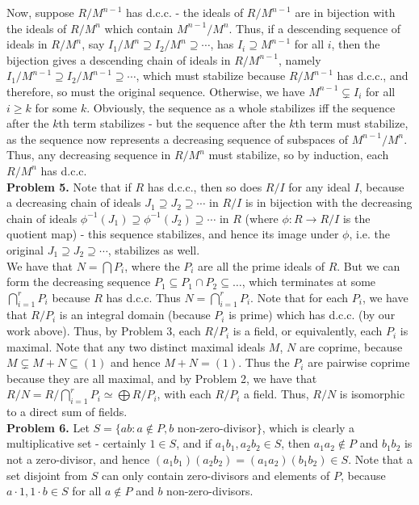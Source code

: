 \documentclass[11pt]{article}
\newcommand{\num}[1]{\noindent \textbf{#1}}
\theoremstyle{definition}
\begin{document}
\noindent Now, suppose $R/M^{n-1}$ has d.c.c. - the ideals of $R/M^{n-1}$ are
in bijection with the ideals of $R/M^n$ which contain $M^{n-1}/M^n$. Thus,
if a descending sequence of ideals in $R/M^n$, say $I_1/M^n\supseteq
I_2/M^n\supseteq \cdots$, has $I_i\supseteq M^{n-1}$ for all $i$, then
the bijection gives a descending chain of ideals in $R/M^{n-1}$, namely
$I_1/M^{n-1}\supseteq I_2/M^{n-1}\supseteq\cdots$, which must stabilize
because $R/M^{n-1}$ has d.c.c., and therefore, so must the original
sequence. Otherwise, we have $M^{n-1}\subsetneq I_i$ for all $i\geq k$ for
some $k$. Obviously, the sequence as a whole stabilizes iff the sequence
after the $k$th term stabilizes - but the sequence after the $k$th term must
stabilize, as the sequence now represents a decreasing sequence of subspaces
of $M^{n-1}/M^n$. Thus, any decreasing sequence in $R/M^n$ must stabilize,
so by induction, each $R/M^n$ has d.c.c.     \\

\num{Problem 5.} Note that if $R$ has d.c.c., then so does $R/I$
for any ideal $I$, because a decreasing chain of ideals $J_1\supseteq
J_2\supseteq\cdots$ in $R/I$ is in bijection with the decreasing chain of
ideals $\phi^{-1}(J_1)\supseteq\phi^{-1}(J_2)\supseteq\cdots$ in $R$ (where
$\phi:R\rightarrow R/I$ is the quotient map) - this sequence stabilizes,
and hence its image under $\phi$, i.e. the original $J_1\supseteq
J_2\supseteq\cdots$, stabilizes as well. \\

\noindent We have that $N=\bigcap P_i$, where the $P_i$ are all the prime
ideals of $R$. But we can form the decreasing sequence $P_1\subseteq P_1\cap
P_2 \subseteq \ldots$, which terminates at some $\bigcap_{i=1}^r P_i$ because
$R$ has d.c.c. Thus $N=\bigcap_{i=1}^r P_i$. Note that for each $P_i$, we
have that $R/P_i$ is an integral domain (because $P_i$ is prime) which has
d.c.c. (by our work above). Thus, by Problem 3, each $R/P_i$ is a field,
or equivalently, each $P_i$ is maximal. Note that any two distinct maximal
ideals $M$, $N$ are coprime, because $M\subsetneq M+N\subseteq (1)$ and hence
$M+N=(1)$. Thus the $P_i$ are pairwise coprime because they are all maximal,
and by Problem 2, we have that $R/N=R/\bigcap_{i=1}^r P_i\simeq\bigoplus
R/P_i$, with each $R/P_i$ a field. Thus, $R/N$ is isomorphic to a direct
sum of fields. \\

\num{Problem 6.} Let $S=\{ab:a\notin P, b$ non-zero-divisor$\}$, which is
clearly a multiplicative set - certainly $1\in S$, and if $a_1b_1,a_2b_2\in
S$, then $a_1a_2\notin P$ and $b_1b_2$ is not a zero-divisor, and hence
$(a_1b_1)(a_2b_2)=(a_1a_2)(b_1b_2)\in S$. Note that a set disjoint from $S$
can only contain zero-divisors and elements of $P$, because $a\cdot1,1\cdot
b\in S$ for all $a\notin P$ and $b$ non-zero-divisors.\\
\end{document}
